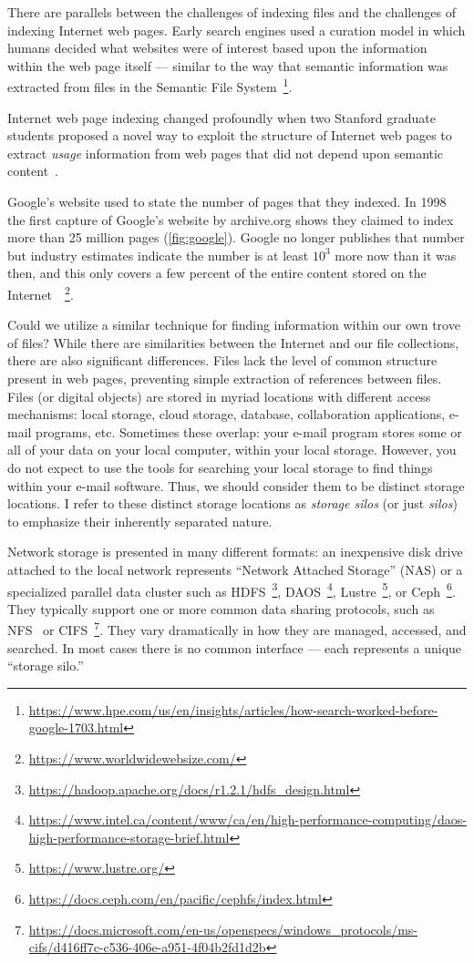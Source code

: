 There are parallels between the challenges of indexing files and the challenges
of indexing Internet web pages. Early search engines used a curation model in which
humans decided what websites were of interest based upon the information within
the web page itself --- similar to the way that semantic information was
extracted from files in the Semantic File
System~\footnote{\url{https://www.hpe.com/us/en/insights/articles/how-search-worked-before-google-1703.html}}.

Internet web page indexing changed profoundly when two Stanford graduate
students proposed a novel way to exploit the structure of Internet web pages to
extract \emph{usage} information from web pages that did not depend upon
semantic content~\cite{page1999pagerank}.

Google's website used to state the number of pages that they indexed.  In 1998
the first capture of Google's website by archive.org shows they claimed to index
more than 25 million pages (\autoref{fig:google}). Google no longer publishes
that number but industry estimates indicate the number is at least $10^3$ more
now than it was then, and this only covers a few percent of the entire content
stored on the
Internet~\cite{bosch2016estimating}~\footnote{\url{https://www.worldwidewebsize.com/}}.

Could we utilize a similar technique for finding information within our own
trove of files? While there are similarities between the Internet and our file
collections, there are also significant differences. Files lack the level of common
structure present in web pages, preventing simple extraction of references
between files. Files (or digital objects) are stored in myriad
locations with different access mechanisms: local storage, cloud storage,
database, collaboration applications, e-mail programs, etc.  Sometimes these
overlap: your e-mail program stores some or all of your data on your local
computer, within your local storage. However, you do not expect to use the tools
for searching your local storage to find things within your e-mail software.
Thus, we should consider them to be distinct storage locations. I refer to these
distinct storage locations as \emph{storage silos} (or just \emph{silos}) to
emphasize their inherently separated nature.

Network storage is presented in many different formats: an inexpensive disk
drive attached to the local network represents ``Network Attached Storage''
(NAS) or a specialized parallel data cluster such as HDFS~\footnote{\url{https://hadoop.apache.org/docs/r1.2.1/hdfs_design.html}},
DAOS~\footnote{\url{https://www.intel.ca/content/www/ca/en/high-performance-computing/daos-high-performance-storage-brief.html}},
Lustre~\footnote{\url{https://www.lustre.org/}}, or
Ceph~\footnote{\url{https://docs.ceph.com/en/pacific/cephfs/index.html}}.
They typically support one or
more common data sharing protocols, such as NFS~\cite{sandberg1986sun} or
CIFS~\footnote{\url{https://docs.microsoft.com/en-us/openspecs/windows_protocols/ms-cifs/d416ff7c-c536-406e-a951-4f04b2fd1d2b}}.
They vary dramatically in how they are managed, accessed, and searched.  In most
cases there is no common interface --- each represents a unique ``storage
silo.''

